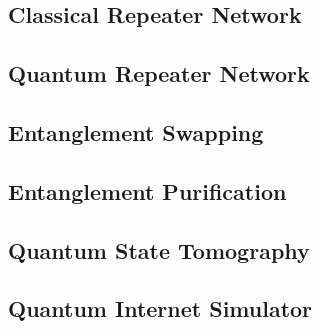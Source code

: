 \subsection{Classical Repeater Network}
\subsection{Quantum Repeater Network}
\subsection{Entanglement Swapping}
\subsection{Entanglement Purification}
\subsection{Quantum State Tomography}
\subsection{Quantum Internet Simulator}

